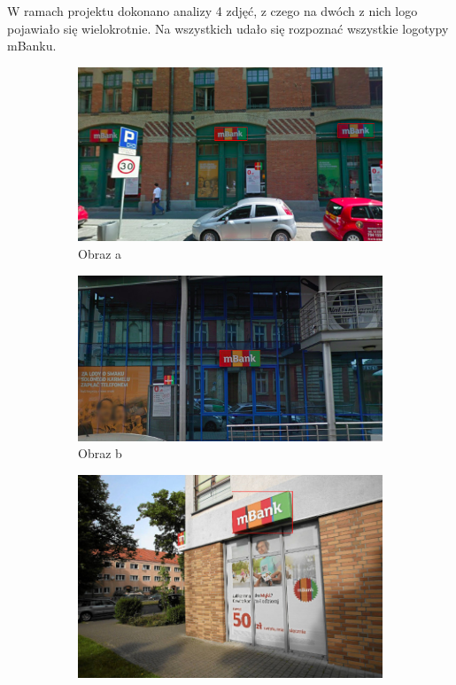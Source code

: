 W ramach projektu dokonano analizy 4 zdjęć, z czego na dwóch z nich logo pojawiało się wielokrotnie. Na wszystkich udało się rozpoznać wszystkie logotypy mBanku.

\begin{figure}[h]
\begin{subfigure}{.5\textwidth}
  \centering
  \includegraphics[width=.8\linewidth]{figures/img1_marked_out.png}
  \caption{Obraz a}
  \label{fig:sfig1}
\end{subfigure}%
\begin{subfigure}{.5\textwidth}
  \centering
  \includegraphics[width=.8\linewidth]{figures/img2_marked_out.png}
  \caption{Obraz b}
  \label{fig:sfig2}
\end{subfigure}
\begin{subfigure}{.5\textwidth}
  \centering
  \includegraphics[width=.8\linewidth]{figures/img3_marked_out.png}

\end{subfigure}
\end{figure}
